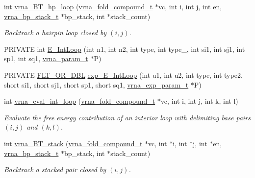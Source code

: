 \begin{DoxyCompactItemize}
int \hyperlink{group__loops_ga6c4ba14d24f716d0ca9021771357e903}{vrna\+\_\+\+B\+T\+\_\+hp\+\_\+loop} (\hyperlink{group__fold__compound_ga1b0cef17fd40466cef5968eaeeff6166}{vrna\+\_\+fold\+\_\+compound\+\_\+t} $\ast$vc, int i, int j, int en, \hyperlink{group__data__structures_gaa651bda42e7692f08cb603cd6834b0ee}{vrna\+\_\+bp\+\_\+stack\+\_\+t} $\ast$bp\+\_\+stack, int $\ast$stack\+\_\+count)
\begin{DoxyCompactList}\small\item\em Backtrack a hairpin loop closed by $ (i,j) $. \end{DoxyCompactList}\item 
P\+R\+I\+V\+A\+TE int \hyperlink{group__loops_gaafbc187b7f78e8e82afb77dd6f3b8fc5}{E\+\_\+\+Int\+Loop} (int n1, int n2, int type, int type\+\_, int si1, int sj1, int sp1, int sq1, \hyperlink{group__energy__parameters_ga8a69ca7d787e4fd6079914f5343a1f35}{vrna\+\_\+param\+\_\+t} $\ast$P)
\item 
P\+R\+I\+V\+A\+TE \hyperlink{group__data__structures_ga31125aeace516926bf7f251f759b6126}{F\+L\+T\+\_\+\+O\+R\+\_\+\+D\+BL} \hyperlink{group__loops_ga95de54d8a2a17645a95e0f34e189d9c9}{exp\+\_\+\+E\+\_\+\+Int\+Loop} (int u1, int u2, int type, int type2, short si1, short sj1, short sp1, short sq1, \hyperlink{group__energy__parameters_ga01d8b92fe734df8d79a6169482c7d8d8}{vrna\+\_\+exp\+\_\+param\+\_\+t} $\ast$P)
\item 
int \hyperlink{group__loops_ga018f1314dbbae42fdd27c94670b61721}{vrna\+\_\+eval\+\_\+int\+\_\+loop} (\hyperlink{group__fold__compound_ga1b0cef17fd40466cef5968eaeeff6166}{vrna\+\_\+fold\+\_\+compound\+\_\+t} $\ast$vc, int i, int j, int k, int l)
\begin{DoxyCompactList}\small\item\em Evaluate the free energy contribution of an interior loop with delimiting base pairs $(i,j)$ and $(k,l)$. \end{DoxyCompactList}\item 
\mbox{\label{group__loops_gad320d5d721e33bed120168213d8f45e5}} 
int \hyperlink{group__loops_gad320d5d721e33bed120168213d8f45e5}{vrna\+\_\+\+B\+T\+\_\+stack} (\hyperlink{group__fold__compound_ga1b0cef17fd40466cef5968eaeeff6166}{vrna\+\_\+fold\+\_\+compound\+\_\+t} $\ast$vc, int $\ast$i, int $\ast$j, int $\ast$en, \hyperlink{group__data__structures_gaa651bda42e7692f08cb603cd6834b0ee}{vrna\+\_\+bp\+\_\+stack\+\_\+t} $\ast$bp\+\_\+stack, int $\ast$stack\+\_\+count)
\begin{DoxyCompactList}\small\item\em Backtrack a stacked pair closed by $ (i,j) $. \end{DoxyCompactList}\item 

\end{DoxyCompactItemize}
